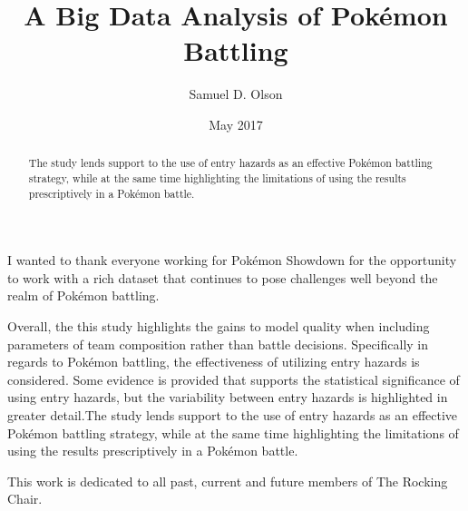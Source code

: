 \documentclass[12pt,twoside]{reedthesis}
\title{A Big Data Analysis of Pokémon Battling}
\author{Samuel D. Olson}
\date{May 2017}
\begin{document}
      \maketitle
  
  \frontmatter %
  \pagestyle{empty} %

      \begin{acknowledgements}
      I wanted to thank everyone working for Pokémon Showdown for the
      opportunity to work with a rich dataset that continues to pose
      challenges well beyond the realm of Pokémon battling.
    \end{acknowledgements}
  
      \begin{preface}
      Overall, the this study highlights the gains to model quality when
      including parameters of team composition rather than battle decisions.
      Specifically in regards to Pokémon battling, the effectiveness of
      utilizing entry hazards is considered. Some evidence is provided that
      supports the statistical significance of using entry hazards, but the
      variability between entry hazards is highlighted in greater detail.The
      study lends support to the use of entry hazards as an effective Pokémon
      battling strategy, while at the same time highlighting the limitations
      of using the results prescriptively in a Pokémon battle.
    \end{preface}
  
      \hypersetup{linkcolor=black}
    \setcounter{tocdepth}{2}
    \tableofcontents
  
      \listoftables
  
      \listoffigures
  
      \begin{abstract}
      \par  
      
      The study lends support to the use of entry hazards as an effective
      Pokémon battling strategy, while at the same time highlighting the
      limitations of using the results prescriptively in a Pokémon battle.
    \end{abstract}
  
      \begin{dedication}
      This work is dedicated to all past, current and future members of The
      Rocking Chair.
    \end{dedication}
  
\end{document}
